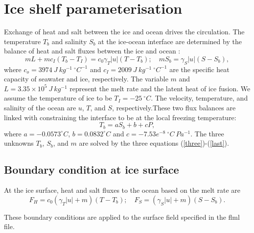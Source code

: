 \section{Ice shelf parameterisation}
Exchange of heat and salt between the ice and ocean drives the circulation.
The temperature $T_b$ and salinity $S_b$ at the ice-ocean interface are determined by the balance of heat and salt fluxes between the ice and ocean \cite[e.g.][]{mcpheebook,jenkins95}:
\begin{equation}
mL + mc_I(T_b-T_I)=c_0 \gamma_T |u| (T-T_b); \quad mS_b=\gamma_S |u| (S-S_b),
\label{three}
\end{equation}
where $c_o=3974~J~kg^{-1}~^\circ C^{-1}$ and $c_I=2009~J~kg^{-1}~^\circ C^{-1}$ are the specific heat capacity of seawater and ice, respectively. The variable $m$ and $L=3.35 \times 10^{5}~J~kg^{-1}$ represent the melt rate and the latent heat of ice fusion.
We assume the temperature of ice to be $T_I=-25~^\circ C $. The velocity, temperature, and salinity of the ocean are $u$, $T$, and $S$, respectively.These two flux balances are linked with constraining the interface to be at the local freezing temperature:
\begin{equation}
T_b = aS_b+b + cP,
\label{last}
\end{equation}
where $a=-0.0573 ^\circ C$, $b=0.0832 ^\circ C$ and $c=-7.53e^{-8}~^\circ C~Pa^{-1} $.
The three unknowns $T_b$, $S_b$, and $m$ are solved by the three equations (\ref{three})-(\ref{last}). 

\subsection{Boundary condition at ice surface}
At the ice surface, heat and salt fluxes to the ocean based on the melt rate are
\begin{equation}
F_H = c_0(\gamma_T |u|+ m)(T-T_b); \quad F_S = (\gamma_S|u|+ m)(S-S_b).
\end{equation}

These boundary conditions are applied to the surface field specified in the flml file.
